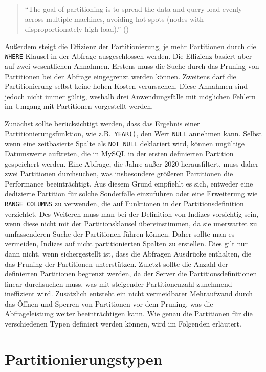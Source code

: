 \begin{quote}
	\enquote{The goal of partitioning is to spread the data and query load evenly across multiple machines, avoiding hot spots (nodes with disproportionately high load).} (\cite[S. 217]{kleppmann2017designing})
\end{quote}

Außerdem steigt die Effizienz der Partitionierung, je mehr Partitionen durch die \texttt{WHERE}-Klausel in der Abfrage ausgeschlossen werden.
Die Effizienz basiert aber auf zwei wesentlichen Annahmen.
Erstens muss die Suche durch das Pruning von Partitionen bei der Abfrage eingegrenzt werden können.
Zweitens darf die Partitionierung selbst keine hohen Kosten verursachen.
Diese Annahmen sind jedoch nicht immer gültig, weshalb drei Anwendungsfälle mit möglichen Fehlern im Umgang mit Partitionen vorgestellt werden.

Zunächst sollte berücksichtigt werden, dass das Ergebnis einer Partitionierungsfunktion, wie z.B.\ \texttt{YEAR()}, den Wert \texttt{NULL} annehmen kann.
Selbst wenn eine zeitbasierte Spalte als \texttt{NOT NULL} deklariert wird, können ungültige Datumswerte auftreten, die in MySQL in der ersten definierten Partition gespeichert werden.
Eine Abfrage, die Jahre außer 2020 herausfiltert, muss daher zwei Partitionen durchsuchen, was insbesondere größeren Partitionen die Performance beeinträchtigt.
Aus diesem Grund empfiehlt es sich, entweder eine dedizierte Partition für solche Sonderfälle einzuführen oder eine Erweiterung wie \texttt{RANGE COLUMNS} zu verwenden, die auf Funktionen in der Partitionsdefinition verzichtet.
Des Weiteren muss man bei der Definition von Indizes vorsichtig sein, wenn diese nicht mit der Partitionsklausel übereinstimmen, da sie unerwartet zu umfassenderen Suche der Partitionen führen können.
Daher sollte man es vermeiden, Indizes auf nicht partitionierten Spalten zu erstellen.
Dies gilt nur dann nicht, wenn sichergestellt ist, dass die Abfragen Ausdrücke enthalten, die das Pruning der Partitionen unterstützen.
Zuletzt sollte die Anzahl der definierten Partitionen begrenzt werden, da der Server die Partitionsdefinitionen linear durchsuchen muss, was mit steigender Partitionenzahl zunehmend ineffizient wird.
Zusätzlich entsteht ein nicht vermeidbarer Mehraufwand durch das Öffnen und Sperren von Partitionen vor dem Pruning, was die Abfrageleistung weiter beeinträchtigen kann.
Wie genau die Partitionen für die verschiedenen Typen definiert werden können, wird im Folgenden erläutert.

\section{Partitionierungstypen}\label{sec:arten-der-partitionierung}

